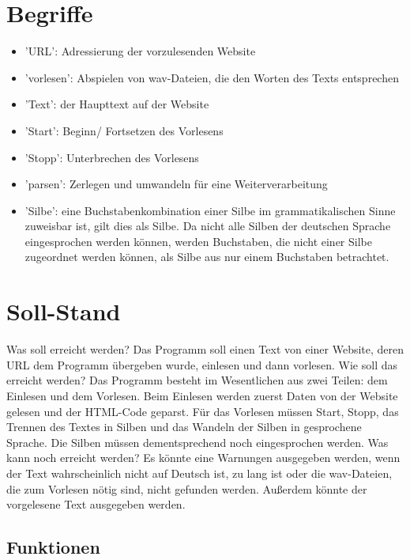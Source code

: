 \documentclass[12pt]{scrartcl}
\begin{document}
\section{Begriffe}
\begin{itemize}
    \item 'URL': Adressierung der vorzulesenden Website
    \item 'vorlesen': Abspielen von wav-Dateien, die den Worten des Texts entsprechen
    \item 'Text': der Haupttext auf der Website
    \item 'Start': Beginn/ Fortsetzen des Vorlesens
    \item 'Stopp': Unterbrechen des Vorlesens
    \item 'parsen': Zerlegen und umwandeln für eine Weiterverarbeitung
    \item 'Silbe': eine Buchstabenkombination einer Silbe im grammatikalischen Sinne zuweisbar ist, gilt dies als Silbe. Da nicht alle Silben der deutschen Sprache eingesprochen werden können, werden Buchstaben, die nicht                 einer Silbe zugeordnet werden können, als Silbe aus nur einem Buchstaben betrachtet.
\end{itemize}

\section{Soll-Stand}
Was soll erreicht werden?
Das Programm soll einen Text von einer Website, deren URL dem Programm übergeben wurde, einlesen und dann vorlesen.
Wie soll das erreicht werden?
Das Programm besteht im Wesentlichen aus zwei Teilen: dem Einlesen und dem Vorlesen. Beim Einlesen werden zuerst Daten von der Website gelesen und der HTML-Code geparst. Für das Vorlesen müssen Start, Stopp, das Trennen des Textes in Silben und das Wandeln der Silben in gesprochene Sprache. Die Silben müssen dementsprechend noch eingesprochen werden.
Was kann noch erreicht werden?
Es könnte eine Warnungen ausgegeben werden, wenn der Text wahrscheinlich nicht auf Deutsch ist, zu lang ist oder die wav-Dateien, die zum Vorlesen nötig sind, nicht gefunden werden. Außerdem könnte der vorgelesene Text ausgegeben werden.


\subsection{Funktionen}
\end{document}
